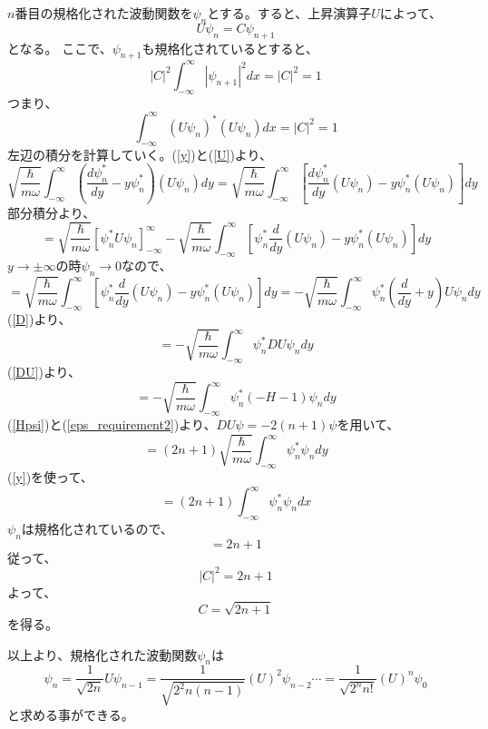 $n$番目の規格化された波動関数を$\psi_n$とする。すると、上昇演算子$U$によって、
\begin{equation}
  U\psi_n = C\psi_{n+1}
\end{equation}
となる。
ここで、$\psi_{n+1}$も規格化されているとすると、
\begin{equation}
  |C|^2 \int_{-\infty}^\infty |\psi_{n+1}|^2 dx = |C|^2 = 1
\end{equation}
つまり、
\begin{equation}
  \int_{-\infty}^\infty (U\psi_n)^*(U\psi_n)dx = |C|^2 = 1
\end{equation}
左辺の積分を計算していく。(\ref{y})と(\ref{U})より、
\begin{equation}
  \sqrt{\dfrac{\hbar}{m\omega}}\int_{-\infty}^\infty (\dfrac{d\psi_n^*}{dy} -y\psi_n^*)(U\psi_n)dy
  = \sqrt{\dfrac{\hbar}{m\omega}}\int_{-\infty}^\infty \left[ \dfrac{d\psi_n^*}{dy}(U\psi_n) -y\psi_n^*(U\psi_n) \right]dy
\end{equation}
部分積分より、
\begin{equation}
  = \sqrt{\dfrac{\hbar}{m\omega}}[\psi_n^* U \psi_n ]_{-\infty}^\infty
  - \sqrt{\dfrac{\hbar}{m\omega}}\int_{-\infty}^\infty \left[ \psi_n^*\dfrac{d}{dy}(U\psi_n) -y\psi_n^*(U\psi_n)\right]dy
\end{equation}
$y \to \pm\infty$の時$\psi_n \to 0$なので、
\begin{equation}
  = \sqrt{\dfrac{\hbar}{m\omega}}\int_{-\infty}^\infty \left[ \psi_n^*\dfrac{d}{dy}(U\psi_n) -y\psi_n^*(U\psi_n)\right]dy
  =  -\sqrt{\dfrac{\hbar}{m\omega}}\int_{-\infty}^\infty \psi_n^* \left(\dfrac{d}{dy} + y\right)U\psi_n dy
\end{equation}
(\ref{D})より、
\begin{equation}
  = -\sqrt{\dfrac{\hbar}{m\omega}}\int_{-\infty}^\infty \psi_n^* DU\psi_n dy
\end{equation}
(\ref{DU})より、
\begin{equation}
  = -\sqrt{\dfrac{\hbar}{m\omega}}\int_{-\infty}^\infty \psi_n^* (-H-1)\psi_n dy
\end{equation}
(\ref{Hpsi})と(\ref{eps_requirement2})より、$DU\psi = -2(n+1)\psi$を用いて、
\begin{equation}
  = (2n+1)\sqrt{\dfrac{\hbar}{m\omega}}\int_{-\infty}^\infty \psi_n^*\psi_n dy
\end{equation}
(\ref{y})を使って、
\begin{equation}
  = (2n+1)\int_{-\infty}^\infty \psi_n^*\psi_n dx
\end{equation}
$\psi_n$は規格化されているので、
\begin{equation}
  = 2n+1
\end{equation}
従って、
\begin{equation}
  |C|^2 = 2n+1
\end{equation}
よって、
\begin{equation}
  C = \sqrt{2n+1}
\end{equation}
を得る。

以上より、規格化された波動関数$\psi_n$は
\begin{equation}
  \psi_{n}=\frac{1}{\sqrt{2 n}} U \psi_{n-1}=\frac{1}{\sqrt{2^{2} n(n-1)}}(U)^{2} \psi_{n-2} \cdots=\frac{1}{\sqrt{2^{n} n !}}(U)^{n} \psi_{0}
\end{equation}
と求める事ができる。
